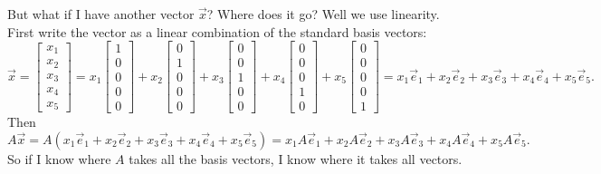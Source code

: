 But what if I have another vector $\vec{x}$?  Where does it go?  Well we use
linearity.  First write the vector as a linear combination of the standard
basis vectors:
\begin{equation*}
\vec{x} =
\begin{bmatrix}
x_1 \\ x_2 \\ x_3 \\ x_4 \\ x_5
\end{bmatrix}
=
x_1
\begin{bmatrix}
1 \\ 0 \\ 0 \\ 0 \\ 0
\end{bmatrix}
+
x_2
\begin{bmatrix}
0 \\ 1 \\ 0 \\ 0 \\ 0
\end{bmatrix}
+
x_3
\begin{bmatrix}
0 \\ 0 \\ 1 \\ 0 \\ 0
\end{bmatrix}
+
x_4
\begin{bmatrix}
0 \\ 0 \\ 0 \\ 1 \\ 0
\end{bmatrix}
+
x_5
\begin{bmatrix}
0 \\ 0 \\ 0 \\ 0 \\ 1
\end{bmatrix}
=
x_1 \vec{e}_1 + 
x_2 \vec{e}_2 + 
x_3 \vec{e}_3 + 
x_4 \vec{e}_4 + 
x_5 \vec{e}_5 .
\end{equation*}
Then
\begin{equation*}
A \vec{x}
=
A ( 
x_1 \vec{e}_1 + 
x_2 \vec{e}_2 + 
x_3 \vec{e}_3 + 
x_4 \vec{e}_4 + 
x_5 \vec{e}_5 
)
=
x_1 A\vec{e}_1 + 
x_2 A\vec{e}_2 + 
x_3 A\vec{e}_3 + 
x_4 A\vec{e}_4 + 
x_5 A\vec{e}_5 .
\end{equation*}
So if I know where $A$ takes all the basis vectors, I know where it takes
all vectors.

